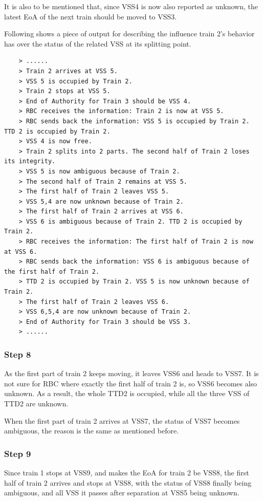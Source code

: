 \documentclass[article,dr=phil,type=msc,colorback,accentcolor=tud9c]{tudthesis}
\begin{document}
    It is also to be mentioned that, since VSS4 is now also reported as unknown, the latest EoA of the next train should be moved to VSS3.
    

    Following shows a piece of output for describing the influence train 2's behavior has over the status of the related VSS at its splitting point.
	
	\begin{verbatim}
	> ......
	> Train 2 arrives at VSS 5.
	> VSS 5 is occupied by Train 2.
	> Train 2 stops at VSS 5.
	> End of Authority for Train 3 should be VSS 4.
	> RBC receives the information: Train 2 is now at VSS 5.
	> RBC sends back the information: VSS 5 is occupied by Train 2. TTD 2 is occupied by Train 2. 
	> VSS 4 is now free.
	> Train 2 splits into 2 parts. The second half of Train 2 loses its integrity.
	> VSS 5 is now ambiguous because of Train 2.
	> The second half of Train 2 remains at VSS 5.
	> The first half of Train 2 leaves VSS 5.
	> VSS 5,4 are now unknown because of Train 2.
	> The first half of Train 2 arrives at VSS 6.
	> VSS 6 is ambiguous because of Train 2. TTD 2 is occupied by Train 2.
	> RBC receives the information: The first half of Train 2 is now at VSS 6.
	> RBC sends back the information: VSS 6 is ambiguous because of the first half of Train 2. 
	> TTD 2 is occupied by Train 2. VSS 5 is now unknown because of Train 2.
	> The first half of Train 2 leaves VSS 6.
	> VSS 6,5,4 are now unknown because of Train 2.
	> End of Authority for Train 3 should be VSS 3.
	> ......
	\end{verbatim}
	
	\subsubsection{Step 8}
	
	As the first part of train 2 keeps moving, it leaves VSS6 and heads to VSS7. It is not sure for RBC where exactly the first half of train 2 is, so VSS6 becomes also unknown. As a result, the whole TTD2 is occupied, while all the three VSS of TTD2 are unknown.
	
	When the first part of train 2 arrives at VSS7, the status of VSS7 becomes ambiguous, the reason is the same as mentioned before.
	
	\subsubsection{Step 9}
	
	Since train 1 stops at VSS9, and makes the EoA for train 2 be VSS8, the first half of train 2 arrives and stops at VSS8, with the status of VSS8 finally being ambiguous, and all VSS it passes after separation at VSS5 being unknown.
	
\end{document}
